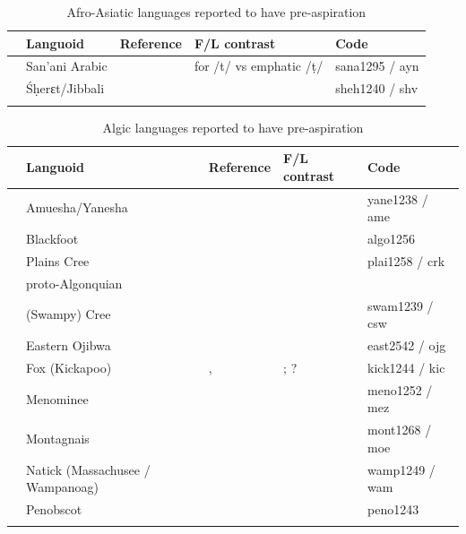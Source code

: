 \documentclass[output=paper]{langscibook}
\begin{document}
\printbibliography[heading=subbibliography,notkeyword=this]

\begin{paperappendix}


\begin{table}
\begin{tabularx}{\textwidth}{@{}l@{}QQQl}
\lsptoprule
& Languoid & Reference & F/L contrast & Code\\
\midrule
 & San’ani Arabic & \citet{WatsonHeselwood2016} & \citet{WatsonHeselwood2016} for /t/ vs emphatic /ṭ/ & sana1295 / ayn\\
& Śḥerɛt/Jibbali & \citet{chapters/12_WatsonEtAl} & \citet{chapters/12_WatsonEtAl} & sheh1240 / shv\\
\lspbottomrule
\end{tabularx}
\caption{Afro-Asiatic languages reported to have pre-aspiration}
\label{tab:key:1}
\end{table}


\begin{table}
\begin{tabularx}{\textwidth}{@{}l@{}QQQl}
\lsptoprule
& Languoid & Reference & F/L contrast & Code\\
\midrule
  & Amuesha/Yanesha & \citet{Silverman2003} &  & yane1238 / ame\\
& Blackfoot &  \citet{ReisSilva2008} &  \citet{ReisSilva2008} & algo1256\\
& Plains Cree & \citet{Hewson1993} &  & plai1258 / crk\\
& proto-Algonquian & \citet{Hewson1993} &  & \\
& (Swampy) Cree & \citet{Silverman2003} &  & swam1239 / csw\\
& Eastern Ojibwa & \citet{Silverman2003} &  & east2542 / ojg\\
& Fox (Kickapoo) & \citet{Silverman2003}, \citet{Gathercole1983} & \citet{Gathercole1983}; ? \citep[586]{Silverman2003} & kick1244 / kic\\
& Menominee & \citet{Clayton2010} &  & meno1252 / mez\\
& Montagnais & \citet{chapters/17_Craioveanu} &  & mont1268 / moe\\
& Natick (Massachusee / Wampanoag) & \citet[30]{Hewson1993} &  & wamp1249 / wam\\
& Penobscot & \citet[30]{Hewson1993} &  & peno1243\\
\lspbottomrule
\end{tabularx}
\caption{Algic languages reported to have pre-aspiration}
\label{tab:key:2}
\end{table}



\end{paperappendix}
\end{document}
